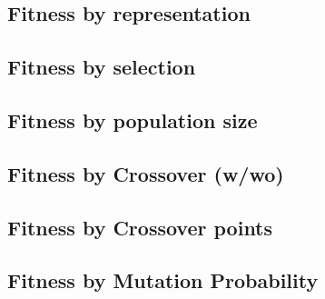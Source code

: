 \documentclass[a4paper]{article}
\begin{document}
\eject \pdfpagewidth=210.0mm \pdfpageheight=297.0mm

\subsection{Fitness by representation}
\label{sec:fitness_by_representation}


\subsection{Fitness by selection}
\label{sec:fitness_by_selection}


\subsection{Fitness by population size}
\label{sec:fitness_by_population_size}


\subsection{Fitness by Crossover (w/wo)}
\label{sec:crossover_on_off}


\subsection{Fitness by Crossover points}
\label{sec:crossover_points}


\eject \pdfpagewidth=420.0mm \pdfpageheight=297.0mm

\subsection{Fitness by Mutation Probability}
\label{sec:mutation}

\end{document}
